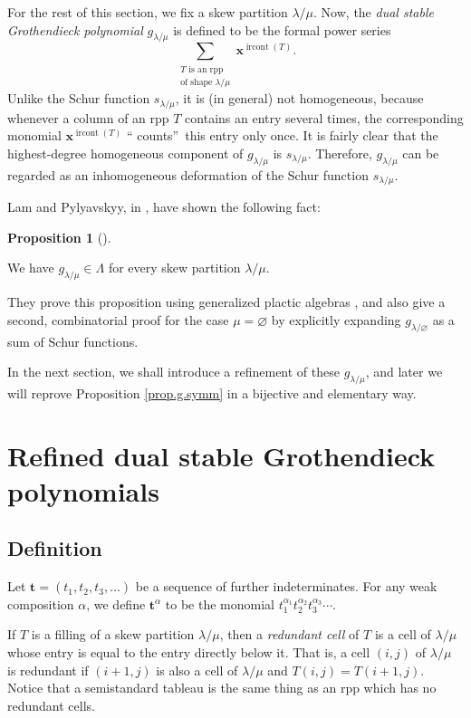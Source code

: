 \documentclass[numbers=enddot,12pt,final,onecolumn,notitlepage]{scrartcl}%
\theoremstyle{definition}
\newtheorem{prop}[theo]{Proposition}
\newenvironment{proposition}[1][]
{\begin{prop}[#1]\begin{leftbar}}
{\end{leftbar}\end{prop}}
\let\sumnonlimits\sum
\renewcommand{\sum}{\sumnonlimits\limits}
\def\t{{\mathbf{t}}}
\def\lm{{\lambda/\mu}}
\begin{document}
For the rest of this section, we fix a skew partition $\lambda/\mu$. Now, the
\textit{dual stable Grothendieck polynomial} $g_{\lambda/\mu}$ is defined to
be the formal power series%
\[
\sum_{\substack{T\text{ is an rpp}\\\text{of shape }\lm}}\mathbf{x}^{\operatorname*{ircont}\left(  T\right)  }.
\]
Unlike the Schur function $s_{\lambda/\mu}$, it is (in
general) not homogeneous, because whenever a column of an rpp $T$ contains an
entry several times, the corresponding monomial $\mathbf{x}%
^{\operatorname*{ircont}\left(  T\right)  }$ \textquotedblleft
counts\textquotedblright\ this entry only once. It is fairly clear that the
highest-degree homogeneous component of $g_{\lambda/\mu}$ is $s_{\lambda/\mu}$. Therefore, $g_{\lambda/\mu}$ can be regarded as an
inhomogeneous deformation of the Schur function $s_{\lambda/\mu}$.

Lam and Pylyavskyy, in \cite[\S 9.1]{LamPyl}, have shown the following fact:

\begin{proposition}
\label{prop.g.symm}We have $g_{\lambda/\mu}\in\Lambda$ for every skew
partition $\lambda/\mu$.
\end{proposition}


They prove this proposition using generalized plactic algebras \cite[Lemma
3.1]{FomGre}, and also give a second, combinatorial proof for the case
$\mu=\varnothing$ by explicitly expanding $g_{\lambda/\varnothing}$ as a sum
of Schur functions.


In the next section, we shall introduce a refinement of these $g_{\lambda/\mu
}$, and later we will reprove Proposition \ref{prop.g.symm} in a
bijective 
and elementary way.

\section{\label{sect.def}Refined dual stable Grothendieck polynomials}

\subsection{Definition}

 Let $\t=\left(t_{1},t_{2},t_{3},\ldots\right)$ be a sequence of further indeterminates. For any weak composition $\alpha$, we define $\t^\alpha$ to be the monomial $t_1^{\alpha_1} t_2^{\alpha_2} t_3^{\alpha_3} \cdots$.

 If $T$ is a filling of a skew partition $\lm$,
then a \textit{redundant cell} of $T$ is a cell of $\lm$ whose entry is equal to the entry directly below it. That is, a cell $\left(  i,j\right)  $
of $\lm$ is redundant if $\left(  i+1,j\right)  $ is also a cell of $\lm$ and 
$T\left(  i,j\right)  =T\left(  i+1,j\right)  $. Notice that a semistandard
tableau is the same thing as an rpp which has no redundant
cells.
\end{document}
